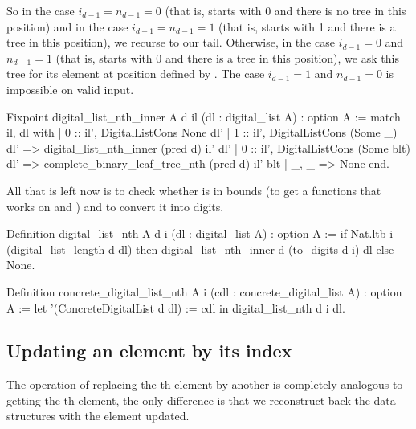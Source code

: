 \documentclass{article}
\begin{document}
So in the case $i_{d - 1} = n_{d - 1} = 0$ (that is,  starts with 0 and there is no tree in this position) and in the case $i_{d - 1} = n_{d - 1} = 1$ (that is,  starts with 1 and there is a tree in this position), we recurse to our tail. Otherwise, in the case $i_{d - 1} = 0$ and $n_{d - 1} = 1$ (that is,  starts with 0 and there is a tree in this position), we ask this tree for its element at position defined by . The case $i_{d - 1} = 1$ and $n_{d - 1} = 0$ is impossible on valid input.\\%

\begin{coq}
Fixpoint digital_list_nth_inner {A} d il (dl : digital_list A) : option A :=
  match il, dl with
  | 0 :: il', DigitalListCons None dl'
  | 1 :: il', DigitalListCons (Some _) dl' => digital_list_nth_inner (pred d) il' dl'
  | 0 :: il', DigitalListCons (Some blt) dl' => complete_binary_leaf_tree_nth (pred d) il' blt
  | _, _ => None
  end.
\end{coq}

All that is left now is to check whether  is in bounds (to get a functions that works on and ) and to convert it into digits.

\begin{coq}
Definition digital_list_nth {A} d i (dl : digital_list A) : option A :=
  if Nat.ltb i (digital_list_length d dl)
  then digital_list_nth_inner d (to_digits d i) dl
  else None.

Definition concrete_digital_list_nth {A} i (cdl : concrete_digital_list A) : option A :=
  let '(ConcreteDigitalList d dl) := cdl in digital_list_nth d i dl.
\end{coq}

\subsection{Updating an element by its index}

The operation of replacing the th element by another  is completely analogous to getting the th element, the only difference is that we reconstruct back the data structures with the element updated.
\end{document}
